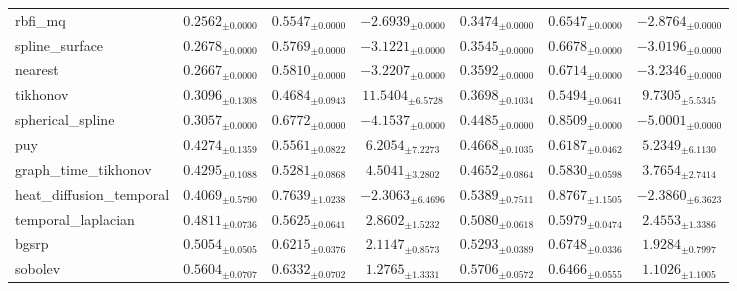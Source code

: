 \begin{table}[ht]
\begin{tabular}{lcccccc}
rbfi\_mq & $0.2562_{\pm 0.0000}$ & $0.5547_{\pm 0.0000}$ & $-2.6939_{\pm 0.0000}$ & $0.3474_{\pm 0.0000}$ & $0.6547_{\pm 0.0000}$ & $-2.8764_{\pm 0.0000}$ \\
spline\_surface & $0.2678_{\pm 0.0000}$ & $0.5769_{\pm 0.0000}$ & $-3.1221_{\pm 0.0000}$ & $0.3545_{\pm 0.0000}$ & $0.6678_{\pm 0.0000}$ & $-3.0196_{\pm 0.0000}$ \\
nearest & $0.2667_{\pm 0.0000}$ & $0.5810_{\pm 0.0000}$ & $-3.2207_{\pm 0.0000}$ & $0.3592_{\pm 0.0000}$ & $0.6714_{\pm 0.0000}$ & $-3.2346_{\pm 0.0000}$ \\
tikhonov & $0.3096_{\pm 0.1308}$ & $0.4684_{\pm 0.0943}$ & $11.5404_{\pm 6.5728}$ & $0.3698_{\pm 0.1034}$ & $0.5494_{\pm 0.0641}$ & $9.7305_{\pm 5.5345}$ \\
spherical\_spline & $0.3057_{\pm 0.0000}$ & $0.6772_{\pm 0.0000}$ & $-4.1537_{\pm 0.0000}$ & $0.4485_{\pm 0.0000}$ & $0.8509_{\pm 0.0000}$ & $-5.0001_{\pm 0.0000}$ \\
puy & $0.4274_{\pm 0.1359}$ & $0.5561_{\pm 0.0822}$ & $6.2054_{\pm 7.2273}$ & $0.4668_{\pm 0.1035}$ & $0.6187_{\pm 0.0462}$ & $5.2349_{\pm 6.1130}$ \\
graph\_time\_tikhonov & $0.4295_{\pm 0.1088}$ & $0.5281_{\pm 0.0868}$ & $4.5041_{\pm 3.2802}$ & $0.4652_{\pm 0.0864}$ & $0.5830_{\pm 0.0598}$ & $3.7654_{\pm 2.7414}$ \\
heat\_diffusion\_temporal & $0.4069_{\pm 0.5790}$ & $0.7639_{\pm 1.0238}$ & $-2.3063_{\pm 6.4696}$ & $0.5389_{\pm 0.7511}$ & $0.8767_{\pm 1.1505}$ & $-2.3860_{\pm 6.3623}$ \\
temporal\_laplacian & $0.4811_{\pm 0.0736}$ & $0.5625_{\pm 0.0641}$ & $2.8602_{\pm 1.5232}$ & $0.5080_{\pm 0.0618}$ & $0.5979_{\pm 0.0474}$ & $2.4553_{\pm 1.3386}$ \\
bgsrp & $0.5054_{\pm 0.0505}$ & $0.6215_{\pm 0.0376}$ & $2.1147_{\pm 0.8573}$ & $0.5293_{\pm 0.0389}$ & $0.6748_{\pm 0.0336}$ & $1.9284_{\pm 0.7997}$ \\
sobolev & $0.5604_{\pm 0.0707}$ & $0.6332_{\pm 0.0702}$ & $1.2765_{\pm 1.3331}$ & $0.5706_{\pm 0.0572}$ & $0.6466_{\pm 0.0555}$ & $1.1026_{\pm 1.1005}$ \\
\bottomrule
\end{tabular}
\end{table}







